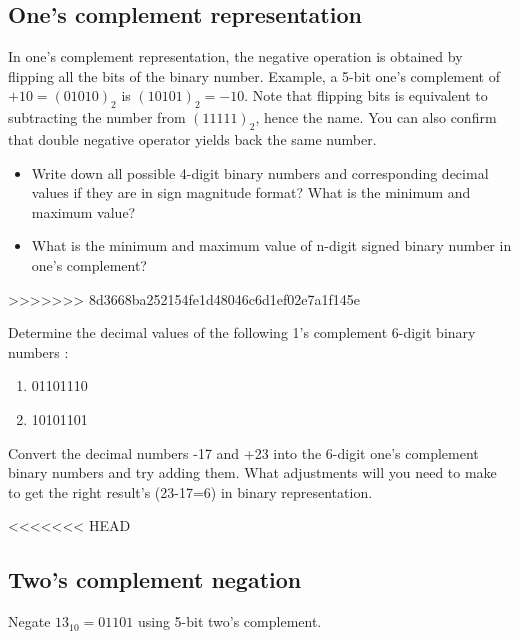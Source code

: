\subsection{One's complement representation}

In one's complement representation, the negative operation is obtained by flipping
all the bits of the binary number. Example, a 5-bit one's
complement of $+10 = (01010)_2$ is $(10101)_2 = -10$. Note that flipping bits is
equivalent to subtracting the number from $(11111)_2$, hence the name. You can
also confirm that double negative operator yields back the same number.

\begin{prob}
  \begin{itemize}
  \item Write down all possible 4-digit binary numbers and corresponding decimal
    values if they are in sign magnitude format? What is the minimum and maximum value?
  \item What is the minimum and maximum value of n-digit signed binary number in
    one's complement?
  \end{itemize}
\end{prob}
>>>>>>> 8d3668ba252154fe1d48046c6d1ef02e7a1f145e
\vspace{20em}

\begin{prob}
  Determine the decimal values of the following 1’s complement 6-digit binary numbers :
  \begin{enumerate}
  \item 01101110
  \item 10101101
  \end{enumerate}
\end{prob}
\vspace{20em}

\begin{prob}
  Convert the decimal numbers -17 and +23 into the 6-digit one's complement binary numbers and try adding them. What
  adjustments will you need to make to get the right result's (23-17=6) in binary representation.
\end{prob}
\vspace{20em}


<<<<<<< HEAD
\subsection{Two's complement negation}

Negate $13_{10} = 01101$ using 5-bit two's complement.
\vspace{10em}

